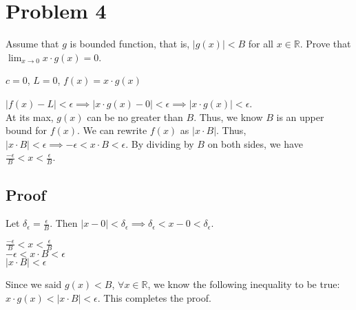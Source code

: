 \documentclass{article}
\newcommand\abs[1]{\left|#1\right|}
\begin{document}
\section*{Problem 4}
\begin{flushleft}
Assume that $g$ is bounded function, that is, $\abs{g(x)} < B$ for all $x \in \mathbb{R}$. Prove that
$\displaystyle \lim_{x \to 0}  x \cdot g(x) = 0$. \\

\vspace{.5cm}

\begin{center}
$c=0$, $L=0$, $f(x)=x \cdot g(x)$
\end{center}

$\abs{f(x) - L} < \epsilon \implies \abs{x \cdot g(x) - 0} < \epsilon \implies \abs{x \cdot g(x)} < \epsilon$. \\
\vspace{.2cm}
At its max, $g(x)$ can be no greater than $B$. Thus, we know $B$ is an upper bound for $f(x)$. We can rewrite $f(x)$ as $\abs{x \cdot B}$. Thus, $\abs{x \cdot B} < \epsilon \implies -\epsilon < x \cdot B < \epsilon$. By dividing by $B$ on both sides, we have $\frac{-\epsilon}{B} < x < \frac{\epsilon}{B}$. \\

\subsection*{Proof}
Let $\delta_\epsilon = \frac{\epsilon}{B}$. Then $\abs{x - 0} < \delta_\epsilon \implies \delta_\epsilon < x - 0 < \delta_\epsilon$. \\
\begin{center}
$\frac{-\epsilon}{B} < x < \frac{\epsilon}{B}$ \\
\vspace{.2cm}
$-\epsilon < x \cdot B < \epsilon$ \\
\vspace{.2cm}
$\abs{x \cdot B} < \epsilon$
\end{center}

Since we said $g(x) < B$, $\forall x \in \mathbb{R}$, we know the following inequality to be true: $x \cdot g(x) < \abs{x \cdot B} < \epsilon$. This completes the proof.
\end{flushleft}
\end{document}

